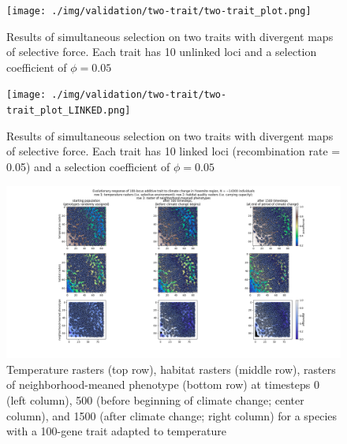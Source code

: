 ﻿\documentclass{article}
\begin{document}
\begin{figure}[h!]
        \texttt{[image: ./img/validation/two-trait/two-trait\_plot.png]}
        \caption{Results of simultaneous selection on two traits with divergent maps of selective force. Each trait has 10 unlinked loci and a selection coefficient of $\phi = 0.05$}
\end{figure}


\begin{figure}[h!]
        \texttt{[image: ./img/validation/two-trait/two-trait\_plot\_LINKED.png]}
        \caption{Results of simultaneous selection on two traits with divergent maps of selective force. Each trait has 10 linked loci (recombination rate = 0.05) and a selection coefficient of $\phi = 0.05$}
\end{figure}


\begin{figure}[h!]
\includegraphics[width=175mm]{./img/example/yosemite_results.png}
        \caption{Temperature rasters (top row), habitat rasters (middle row), rasters of neighborhood-meaned phenotype (bottom row) at timesteps 0 (left column), 500 (before beginning of climate change; center column), and 1500 (after climate change; right column) for a species with a 100-gene trait adapted to temperature}
\end{figure}
\end{document}
